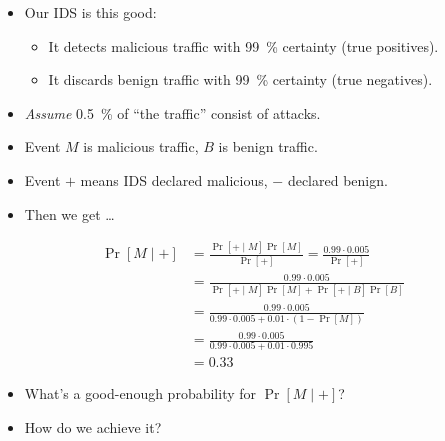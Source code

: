 \documentclass{beamer}
\begin{document}
\begin{frame}
  \begin{example}
    \begin{itemize}
      \item Our IDS is this good:
        \begin{itemize}
          \item It detects malicious traffic with \SI{99}{\percent} certainty 
            (true positives).
          \item It discards benign traffic with \SI{99}{\percent} certainty 
            (true negatives).
        \end{itemize}

        \pause{}

      \item \emph{Assume} \SI{0.5}{\percent} of \enquote{the traffic} consist 
        of attacks.

        \pause{}

      \item Event \(M\) is malicious traffic, \(B\) is benign traffic.
      \item Event \(+\) means IDS declared malicious, \(-\) declared benign.

        \pause{}

      \item Then we get \dots
    \end{itemize}
  \end{example}
\end{frame}

\begin{frame}
  \begin{example}
    \begin{align*}
      \Pr[M\mid +] &= \frac{\Pr[+\mid M] \Pr[M]}{\Pr[+]}
      = \frac{0.99\cdot 0.005}{\Pr[+]} \\
      &= \frac{0.99\cdot 0.005}{\Pr[+\mid M] \Pr[M] + \Pr[+\mid B] \Pr[B]} 
      \\
      &= \frac{0.99\cdot 0.005}{0.99\cdot 0.005 + 0.01\cdot (1 - \Pr[M])} 
      \\
      &= \frac{0.99\cdot 0.005}{0.99\cdot 0.005 + 0.01\cdot 0.995} \\
      &= 0.33
    \end{align*}
  \end{example}
\end{frame}

\begin{frame}
  \begin{exercise}
    \begin{itemize}
      \item What's a good-enough probability for \(\Pr[M\mid +]\)?
      \item How do we achieve it?
    \end{itemize}
  \end{exercise}
\end{frame}
\end{document}
